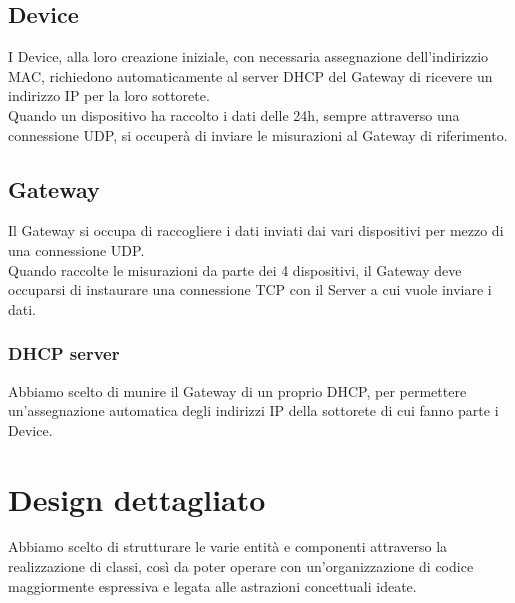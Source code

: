 \documentclass[a4paper,12pt]{report}
\begin{document}
\subsection*{Device}
I Device, alla loro creazione iniziale, con necessaria assegnazione dell'indirizzio MAC, richiedono automaticamente al server DHCP del Gateway di ricevere un indirizzo IP per la loro sottorete.\\
Quando un dispositivo ha raccolto i dati delle 24h, sempre attraverso una connessione UDP, si occuperà di inviare le misurazioni al Gateway di riferimento.\\
\subsection*{Gateway}
Il Gateway si occupa di raccogliere i dati inviati dai vari dispositivi per mezzo di una connessione UDP.\\
Quando raccolte le misurazioni da parte dei 4 dispositivi, il Gateway deve occuparsi di instaurare una connessione TCP con il Server a cui vuole inviare i dati.
\subsubsection*{DHCP server}
Abbiamo scelto di munire il Gateway di un proprio DHCP, per permettere un'assegnazione automatica degli indirizzi IP della sottorete di cui fanno parte i Device.

\clearpage

\section{Design dettagliato}
Abbiamo scelto di strutturare le varie entità e componenti attraverso la realizzazione di classi, così da poter operare con un'organizzazione di codice maggiormente espressiva e legata alle astrazioni concettuali ideate.
\end{document}
